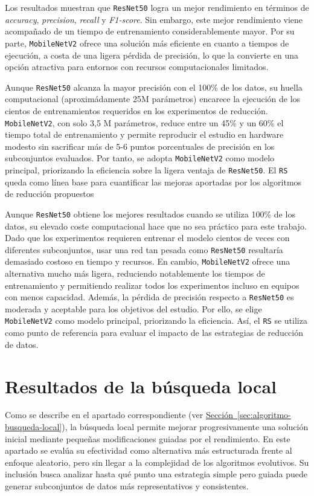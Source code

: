 Los resultados muestran que \texttt{ResNet50} logra un mejor rendimiento en términos de \textit{accuracy}, \textit{precision}, \textit{recall} y \textit{F1-score}.
Sin embargo, este mejor rendimiento viene acompañado de un tiempo de entrenamiento considerablemente mayor.
Por su parte, \texttt{MobileNetV2} ofrece una solución más eficiente en cuanto a tiempos de ejecución, a costa de una ligera pérdida de precisión,
lo que la convierte en una opción atractiva para entornos con recursos computacionales limitados.

Aunque \texttt{ResNet50} alcanza la mayor precisión con el 100\% de los datos, su huella computacional (aproximádamente 25M parámetros) encarece la ejecución de los cientos de entrenamientos requeridos en los experimentos de reducción.
\texttt{MobileNetV2}, con solo 3,5 M parámetros, reduce entre un 45\% y un 60\% el tiempo total de entrenamiento y
permite reproducir el estudio en hardware modesto sin sacrificar más de 5-6 puntos porcentuales de precisión en los subconjuntos evaluados.
Por tanto, se adopta \texttt{MobileNetV2} como modelo principal, priorizando la eficiencia sobre la ligera ventaja de \texttt{ResNet50}.
El \texttt{RS} queda como línea base para cuantificar las mejoras aportadas por los algoritmos de reducción propuestos

Aunque \texttt{ResNet50} obtiene los mejores resultados cuando se utiliza 100\% de los datos,
su elevado coste computacional hace que no sea práctico para este trabajo.
Dado que los experimentos requieren entrenar el modelo cientos de veces con diferentes subconjuntos,
usar una red tan pesada como \texttt{ResNet50} resultaría demasiado costoso en tiempo y recursos.
En cambio, \texttt{MobileNetV2} ofrece una alternativa mucho más ligera,
reduciendo notablemente los tiempos de entrenamiento y permitiendo realizar todos los experimentos incluso en equipos con menos capacidad.
Además, la pérdida de precisión respecto a \texttt{ResNet50} es moderada y aceptable para los objetivos del estudio.
Por ello, se elige \texttt{MobileNetV2} como modelo principal, priorizando la eficiencia.
Así, el \texttt{RS} se utiliza como punto de referencia para evaluar el impacto de las estrategias de reducción de datos.


\section{Resultados de la búsqueda local}\label{sec:resultados-busqueda-local}
Como se describe en el apartado correspondiente (ver \hyperref[sec:algoritmo-busqueda-local]{Sección~\ref*{sec:algoritmo-busqueda-local}}),
la búsqueda local permite mejorar progresivamente una solución inicial mediante pequeñas modificaciones guiadas por el rendimiento.
En este apartado se evalúa su efectividad como alternativa más estructurada frente al enfoque aleatorio, pero sin llegar a la complejidad de los algoritmos evolutivos.
Su inclusión busca analizar hasta qué punto una estrategia simple pero guiada puede generar subconjuntos de datos más representativos y consistentes.


